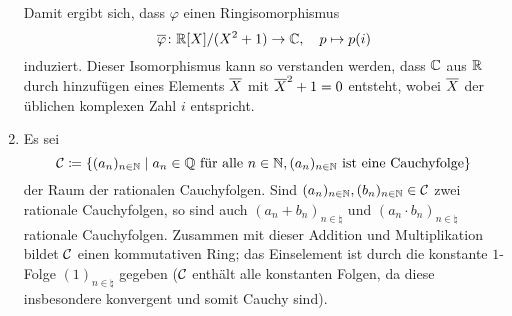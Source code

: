 \begin{example}
\begin{enumerate}
      Damit ergibt sich, dass $\varphi$ einen Ringisomorphismus
      \[
                \overline{\varphi}
        \colon  \mathbb{R}[X]/(X^2 + 1)
        \to     \mathbb{C},
        \quad   p
        \mapsto p(i)
      \]
      induziert.
      Dieser Isomorphismus kann so verstanden werden, dass $\mathbb{C}$ aus $\mathbb{R}$ durch hinzufügen eines Elements $\overline{X}$ mit $\overline{X}^2 + 1 = 0$ entsteht, wobei $\overline{X}$ der üblichen komplexen Zahl $i$ entspricht.
      
    \item
      Es sei
      \[
                  \mathcal{C}
        \coloneqq \{
                    (a_n)_{n \in \mathbb{N}}
                  \mid
                    \text{$a_n \in \mathbb{Q}$ für alle $n \in \mathbb{N}$},
                    \text{$(a_n)_{n \in \mathbb{N}}$ ist eine Cauchyfolge}
                  \}
      \]
      der Raum der rationalen Cauchyfolgen.
      Sind $(a_n)_{n \in \mathbb{N}}, (b_n)_{n \in \mathbb{N}} \in \mathcal{C}$ zwei rationale Cauchyfolgen, so sind auch $(a_n + b_n)_{n \in \natural}$ und $(a_n \cdot b_n)_{n \in \natural}$ rationale Cauchyfolgen.
      Zusammen mit dieser Addition und Multiplikation bildet $\mathcal{C}$ einen kommutativen Ring;
      das Einselement ist durch die konstante $1$-Folge $(1)_{n \in \natural}$ gegeben ($\mathcal{C}$ enthält alle konstanten Folgen, da diese insbesondere konvergent und somit Cauchy sind).
      

\end{enumerate}
\end{example}
